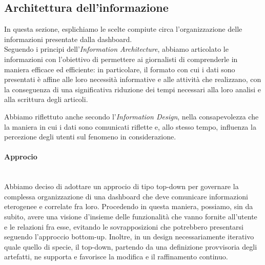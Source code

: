 \subsection{Architettura dell'informazione}

In questa sezione, esplichiamo le scelte compiute circa l'organizzazione delle informazioni presentate dalla dashboard.\\
Seguendo i principi dell'\textit{Information Architecture}, abbiamo articolato le informazioni con l'obiettivo di permettere ai giornalisti di comprenderle in maniera efficace ed efficiente: in particolare, il formato con cui i dati sono presentati è affine alle loro necessità informative e alle attività che realizzano, con la conseguenza di una significativa riduzione dei tempi necessari alla loro analisi e alla scrittura degli articoli. 

Abbiamo riflettuto anche secondo l'\textit{Information Design}, nella consapevolezza che la maniera in cui i dati sono comunicati riflette e, allo stesso tempo, influenza la percezione degli utenti sul fenomeno in considerazione.

\paragraph{Approcio}\mbox{}\\
Abbiamo deciso di adottare un approcio di tipo top-down per governare la complessa organizzazione di una dashboard che deve comunicare informazioni eterogenee e correlate fra loro.
Procedendo in questa maniera, possiamo, sin da subito, avere una visione d'insieme delle funzionalità che vanno fornite all'utente e le relazioni fra esse, evitando le sovrapposizioni che potrebbero presentarsi seguendo l'approccio bottom-up.
Inoltre, in un design necessariamente iterativo quale quello di specie, il top-down, partendo da una definizione provvisoria degli artefatti, ne supporta e favorisce la modifica e il raffinamento continuo.

